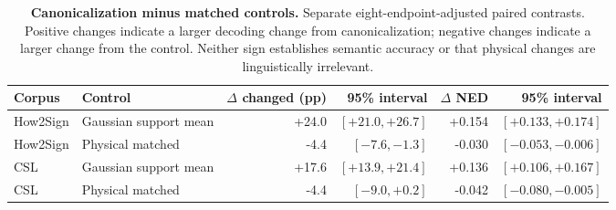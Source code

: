 \begin{table}[t]
\centering\small
\caption{\textbf{Canonicalization minus matched controls.} Separate eight-endpoint-adjusted paired contrasts. Positive changes indicate a larger decoding change from canonicalization; negative changes indicate a larger change from the control. Neither sign establishes semantic accuracy or that physical changes are linguistically irrelevant.}\label{tab:signstabilitycontrasts}
\begin{tabular}{@{}llrrrr@{}}\toprule
Corpus&Control&$\Delta$ changed (pp)&95\% interval&$\Delta$ NED&95\% interval\\\midrule
How2Sign&Gaussian support mean&+24.0&$[+21.0,+26.7]$&+0.154&$[+0.133,+0.174]$\\
How2Sign&Physical matched&-4.4&$[-7.6,-1.3]$&-0.030&$[-0.053,-0.006]$\\
CSL&Gaussian support mean&+17.6&$[+13.9,+21.4]$&+0.136&$[+0.106,+0.167]$\\
CSL&Physical matched&-4.4&$[-9.0,+0.2]$&-0.042&$[-0.080,-0.005]$\\
\bottomrule\end{tabular}\end{table}
